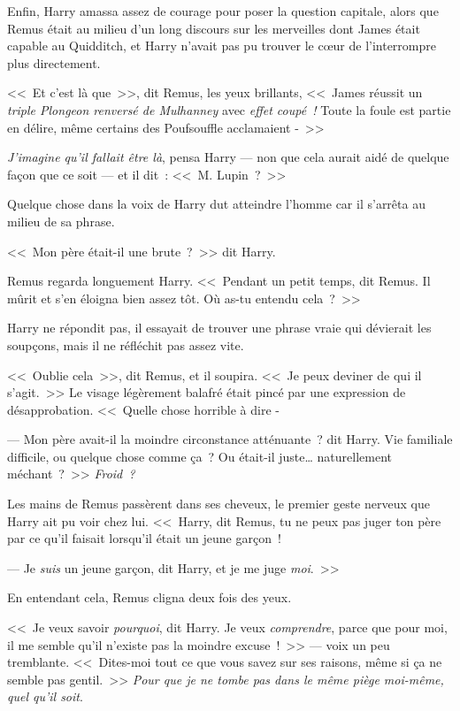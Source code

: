 Enfin, Harry amassa assez de courage pour poser la question capitale, alors que Remus était au milieu d'un long discours sur les merveilles dont James était capable au Quidditch, et Harry n'avait pas pu trouver le cœur de l'interrompre plus directement.

<<~Et c'est là que~>>, dit Remus, les yeux brillants, <<~James réussit un \emph{triple Plongeon renversé de Mulhanney} avec \emph{effet coupé~!} Toute la foule est partie en délire, même certains des Poufsouffle acclamaient -~>>

\emph{J'imagine qu'il fallait être là}, pensa Harry — non que cela aurait aidé de quelque façon que ce soit — et il dit~: <<~M. Lupin~?~>>

Quelque chose dans la voix de Harry dut atteindre l'homme car il s'arrêta au milieu de sa phrase.

<<~Mon père était-il une brute~?~>> dit Harry.

Remus regarda longuement Harry. <<~Pendant un petit temps, dit Remus. Il mûrit et s'en éloigna bien assez tôt. Où as-tu entendu cela~?~>>

Harry ne répondit pas, il essayait de trouver une phrase vraie qui dévierait les soupçons, mais il ne réfléchit pas assez vite.

<<~Oublie cela~>>, dit Remus, et il soupira. <<~Je peux deviner de qui il s'agit.~>> Le visage légèrement balafré était pincé par une expression de désapprobation. <<~Quelle chose horrible à dire -

--- Mon père avait-il la moindre circonstance atténuante~? dit Harry. Vie familiale difficile, ou quelque chose comme ça~? Ou était-il juste… naturellement méchant~?~>> \emph{Froid~?}

Les mains de Remus passèrent dans ses cheveux, le premier geste nerveux que Harry ait pu voir chez lui. <<~Harry, dit Remus, tu ne peux pas juger ton père par ce qu'il faisait lorsqu'il était un jeune garçon~!

--- Je \emph{suis} un jeune garçon, dit Harry, et je me juge \emph{moi}.~>>

En entendant cela, Remus cligna deux fois des yeux.

<<~Je veux savoir \emph{pourquoi}, dit Harry. Je veux \emph{comprendre}, parce que pour moi, il me semble qu'il n'existe pas la moindre excuse~!~>> — voix un peu tremblante. <<~Dites-moi tout ce que vous savez sur ses raisons, même si ça ne semble pas gentil.~>> \emph{Pour que je ne tombe pas dans le même piège moi-même, quel qu'il soit}.


